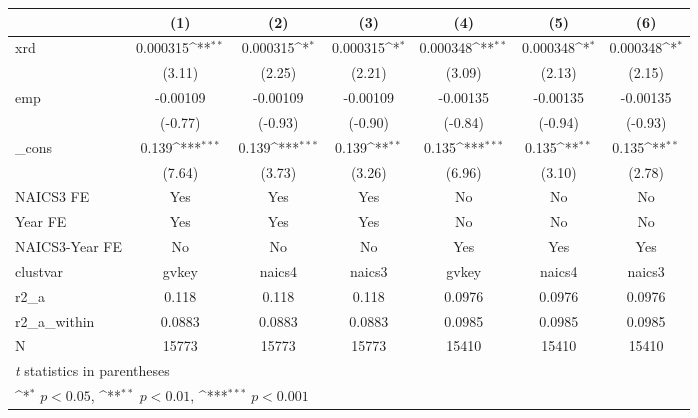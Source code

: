 {
\def\sym#1{\ifmmode^{#1}\else\(^{#1}\)\fi}
\begin{tabular}{l*{6}{c}}
\hline\hline
            &\multicolumn{1}{c}{(1)}         &\multicolumn{1}{c}{(2)}         &\multicolumn{1}{c}{(3)}         &\multicolumn{1}{c}{(4)}         &\multicolumn{1}{c}{(5)}         &\multicolumn{1}{c}{(6)}         \\
\hline
xrd         &    0.000315\sym{**} &    0.000315\sym{*}  &    0.000315\sym{*}  &    0.000348\sym{**} &    0.000348\sym{*}  &    0.000348\sym{*}  \\
            &      (3.11)         &      (2.25)         &      (2.21)         &      (3.09)         &      (2.13)         &      (2.15)         \\
[1em]
emp         &    -0.00109         &    -0.00109         &    -0.00109         &    -0.00135         &    -0.00135         &    -0.00135         \\
            &     (-0.77)         &     (-0.93)         &     (-0.90)         &     (-0.84)         &     (-0.94)         &     (-0.93)         \\
[1em]
\_cons      &       0.139\sym{***}&       0.139\sym{***}&       0.139\sym{**} &       0.135\sym{***}&       0.135\sym{**} &       0.135\sym{**} \\
            &      (7.64)         &      (3.73)         &      (3.26)         &      (6.96)         &      (3.10)         &      (2.78)         \\
[1em]
NAICS3 FE   &         Yes         &         Yes         &         Yes         &          No         &          No         &          No         \\
[1em]
Year FE     &         Yes         &         Yes         &         Yes         &          No         &          No         &          No         \\
[1em]
NAICS3-Year FE&          No         &          No         &          No         &         Yes         &         Yes         &         Yes         \\
\hline
clustvar    &       gvkey         &      naics4         &      naics3         &       gvkey         &      naics4         &      naics3         \\
r2\_a        &       0.118         &       0.118         &       0.118         &      0.0976         &      0.0976         &      0.0976         \\
r2\_a\_within &      0.0883         &      0.0883         &      0.0883         &      0.0985         &      0.0985         &      0.0985         \\
N           &       15773         &       15773         &       15773         &       15410         &       15410         &       15410         \\
\hline\hline
\multicolumn{7}{l}{\footnotesize \textit{t} statistics in parentheses}\\
\multicolumn{7}{l}{\footnotesize \sym{*} \(p<0.05\), \sym{**} \(p<0.01\), \sym{***} \(p<0.001\)}\\
\end{tabular}
}
